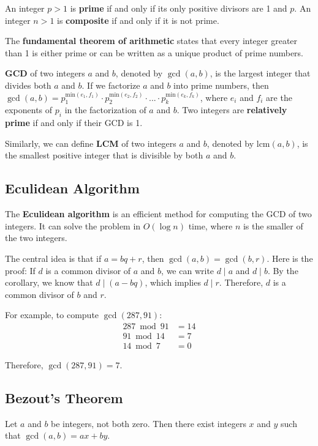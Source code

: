 \documentclass[a4paper,12pt]{article}
\begin{document}
An integer $p > 1$ is \textbf{prime} if and only if its only positive divisors are 1 and $p$.
An integer $n > 1$ is \textbf{composite} if and only if it is not prime.

The \textbf{fundamental theorem of arithmetic} states that every integer greater than 1 is either prime or can be written as a unique product of prime numbers.

\textbf{GCD} of two integers $a$ and $b$, denoted by $\gcd(a,b)$, is the largest integer that divides both $a$ and $b$.
If we factorize $a$ and $b$ into prime numbers, then $\gcd(a,b) = p_1^{\text{min}(e_1, f_1)} \cdot p_2^{\text{min}(e_2, f_2)} \cdot ... \cdot p_k^{\text{min}(e_k, f_k)}$, where $e_i$ and $f_i$ are the exponents of $p_i$ in the factorization of $a$ and $b$.
Two integers are \textbf{relatively prime} if and only if their GCD is 1.

Similarly, we can define \textbf{LCM} of two integers $a$ and $b$, denoted by $\text{lcm}(a,b)$, is the smallest positive integer that is divisible by both $a$ and $b$.

\subsection{Eculidean Algorithm}

The \textbf{Eculidean algorithm} is an efficient method for computing the GCD of two integers.
It can solve the problem in $O(\log n)$ time, where $n$ is the smaller of the two integers.

The central idea is that if $a = bq + r$, then $\gcd(a,b) = \gcd(b,r)$.
Here is the proof:
If $d$ is a common divisor of $a$ and $b$, we can write $d \mid a$ and $d \mid b$.
By the corollary, we know that $d \mid (a - bq)$, which implies $d \mid r$.
Therefore, $d$ is a common divisor of $b$ and $r$.

For example, to compute $\gcd(287,91)$:
\begin{align*}
	287 \bmod 91 &= 14 \\
	91 \bmod 14 &= 7 \\
	14 \bmod 7 &= 0
\end{align*}

Therefore, $\gcd(287,91) = 7$.

\subsection{Bezout's Theorem}

Let $a$ and $b$ be integers, not both zero.
Then there exist integers $x$ and $y$ such that $\gcd(a,b) = ax + by$.
\end{document}
